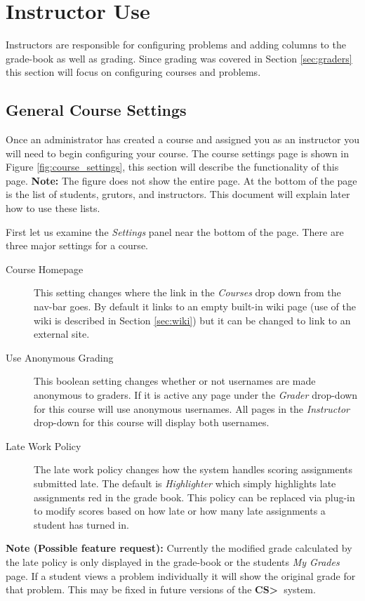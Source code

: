 \documentclass[11pt]{report}
\newcommand{\csgt}[0]{\textbf{CS\textgreater\ }}
\begin{document}
\pagebreak
\section{Instructor Use}
Instructors are responsible for configuring problems and adding columns to the grade-book as well as grading.
Since grading was covered in Section \ref{sec:graders} this section will focus on configuring courses and 
problems.

\subsection{General Course Settings}
Once an administrator has created a course and assigned you as an instructor you will need to begin configuring
your course. The course settings page is shown in Figure \ref{fig:course_settings}, this section will describe
the functionality of this page. \textbf{Note:} The figure does not show the entire page. At the bottom of the
page is the list of students, grutors, and instructors. This document will explain later how to use these lists.

First let us examine the \emph{Settings} panel near the bottom of the page. There are three major settings for
a course.

\begin{description}
\item[Course Homepage] This setting changes where the link in the \emph{Courses} drop down from the nav-bar
goes. By default it links to an empty built-in wiki page (use of the wiki is described in Section \ref{sec:wiki})
but it can be changed to link to an external site.
\item[Use Anonymous Grading] This boolean setting changes whether or not usernames are made anonymous to 
graders. If it is active any page under the \emph{Grader} drop-down for this course will use anonymous usernames. 
All pages in the \emph{Instructor} drop-down for this course will display both usernames.
\item[Late Work Policy] The late work policy changes how the system handles scoring assignments submitted late.
The default is \emph{Highlighter} which simply highlights late assignments red in the grade book. This policy can
be replaced via plug-in to modify scores based on how late or how many late assignments a student has turned in.
\end{description}

\noindent\textbf{Note (Possible feature request):} Currently the modified grade calculated by the late policy
is only displayed in the grade-book or the students \emph{My Grades} page. If a student views a problem 
individually it will show the original grade for that problem. This may be fixed in future versions of the
\csgt system.
\end{document}
